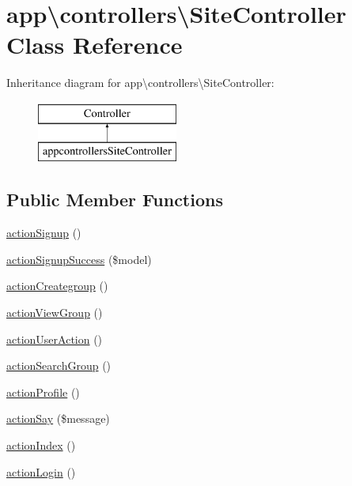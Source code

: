 \hypertarget{classapp_1_1controllers_1_1SiteController}{}\section{app\textbackslash{}controllers\textbackslash{}Site\+Controller Class Reference}
\label{classapp_1_1controllers_1_1SiteController}
Inheritance diagram for app\textbackslash{}controllers\textbackslash{}Site\+Controller\+:\begin{figure}[H]
\begin{center}
\leavevmode
\includegraphics[height=2.000000cm]{classapp_1_1controllers_1_1SiteController}
\end{center}
\end{figure}
\subsection*{Public Member Functions}
\begin{DoxyCompactItemize}
\item 
\hyperlink{classapp_1_1controllers_1_1SiteController_a1c407c5da3459795a0c27d80eaaab5cb}{action\+Signup} ()
\item 
\hyperlink{classapp_1_1controllers_1_1SiteController_a2444906d12a76df58f9e75acf2c6f37f}{action\+Signup\+Success} (\$model)
\item 
\hyperlink{classapp_1_1controllers_1_1SiteController_a63074c19d6f5bd216a72955b0224c042}{action\+Creategroup} ()
\item 
\hyperlink{classapp_1_1controllers_1_1SiteController_a054da8f149f0a2226f509956fad6c3d4}{action\+View\+Group} ()
\item 
\hyperlink{classapp_1_1controllers_1_1SiteController_ace13521ef9b29a1d9b25c3cfb377c357}{action\+User\+Action} ()
\item 
\hyperlink{classapp_1_1controllers_1_1SiteController_a996f13d312c12ddda17298aa0e79a17f}{action\+Search\+Group} ()
\item 
\hyperlink{classapp_1_1controllers_1_1SiteController_add33feeb1946dca691b17c3929e6ad57}{action\+Profile} ()
\item 
\hyperlink{classapp_1_1controllers_1_1SiteController_aadfebaf8b8da2faf40149c0d98d93eb0}{action\+Say} (\$message)
\item 
\hyperlink{classapp_1_1controllers_1_1SiteController_abdee6c5abd4a3b8e633eef175942e46e}{action\+Index} ()
\item 
\hyperlink{classapp_1_1controllers_1_1SiteController_a8ad883ecfb857fc94c385f914ad06c5b}{action\+Login} ()
\end{DoxyCompactItemize}


